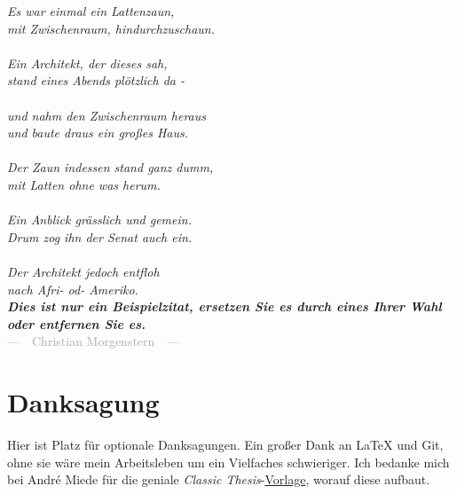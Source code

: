 \begin{temp}
\begin{flushright}{\slshape
Es war einmal ein Lattenzaun,\\
mit Zwischenraum, hindurchzuschaun.\\
~\\
Ein Architekt, der dieses sah,\\
stand eines Abends plötzlich da -\\
~\\
und nahm den Zwischenraum heraus\\
und baute draus ein großes Haus.\\
~\\
Der Zaun indessen stand ganz dumm,\\
mit Latten ohne was herum.\\
~\\
Ein Anblick grässlich und gemein.\\
Drum zog ihn der Senat auch ein.\\
~\\
Der Architekt jedoch entfloh\\
nach Afri- od- Ameriko.\\
\textbf{Dies ist nur ein Beispielzitat, ersetzen Sie es durch eines Ihrer Wahl oder entfernen Sie es.}} \\ \medskip
\textcolor{darkgray}{---~~Christian Morgenstern~~---}
\end{flushright}

\bigskip

\begingroup
\let\clearpage\relax
\let\cleardoublepage\relax
\let\cleardoublepage\relax
\chapter*{Danksagung}
Hier ist Platz für optionale Danksagungen.
Ein großer Dank an \LaTeX{} und Git, ohne sie wäre mein Arbeitsleben um ein Vielfaches schwieriger.
Ich bedanke mich bei André Miede für die geniale \emph{Classic Thesis}-\href{https://ctan.org/pkg/classicthesis}{Vorlage}, worauf diese aufbaut.

\endgroup
\end{temp}
